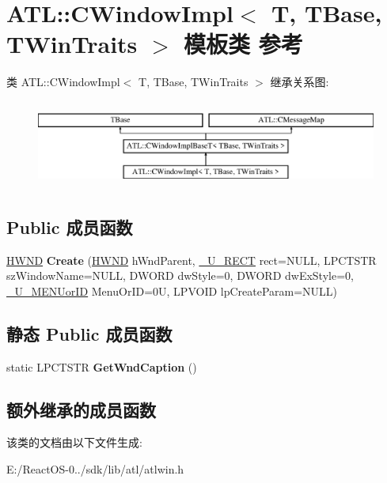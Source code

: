 \hypertarget{class_a_t_l_1_1_c_window_impl}{}\section{A\+TL\+:\+:C\+Window\+Impl$<$ T, T\+Base, T\+Win\+Traits $>$ 模板类 参考}
\label{class_a_t_l_1_1_c_window_impl}
类 A\+TL\+:\+:C\+Window\+Impl$<$ T, T\+Base, T\+Win\+Traits $>$ 继承关系图\+:\begin{figure}[H]
\begin{center}
\leavevmode
\includegraphics[height=2.937063cm]{class_a_t_l_1_1_c_window_impl}
\end{center}
\end{figure}
\subsection*{Public 成员函数}
\begin{DoxyCompactItemize}
\item 
\mbox{\label{class_a_t_l_1_1_c_window_impl_ab17adfd4f9c053f71b6b671c189622b2}} 
\hyperlink{interfacevoid}{H\+W\+ND} {\bfseries Create} (\hyperlink{interfacevoid}{H\+W\+ND} h\+Wnd\+Parent, \hyperlink{class_a_t_l_1_1___u___r_e_c_t}{\+\_\+\+U\+\_\+\+R\+E\+CT} rect=N\+U\+LL, L\+P\+C\+T\+S\+TR sz\+Window\+Name=N\+U\+LL, D\+W\+O\+RD dw\+Style=0, D\+W\+O\+RD dw\+Ex\+Style=0, \hyperlink{class_a_t_l_1_1___u___m_e_n_uor_i_d}{\+\_\+\+U\+\_\+\+M\+E\+N\+Uor\+ID} Menu\+Or\+ID=0\+U, L\+P\+V\+O\+I\+D lp\+Create\+Param=\+N\+U\+L\+L)
\end{DoxyCompactItemize}
\subsection*{静态 Public 成员函数}
\begin{DoxyCompactItemize}
\item 
\mbox{\label{class_a_t_l_1_1_c_window_impl_ad0a2989ca0b2532bbd15b13d590cf16e}} 
static L\+P\+C\+T\+S\+TR {\bfseries Get\+Wnd\+Caption} ()
\end{DoxyCompactItemize}
\subsection*{额外继承的成员函数}


该类的文档由以下文件生成\+:\begin{DoxyCompactItemize}
\item 
E\+:/\+React\+O\+S-\/0../sdk/lib/atl/atlwin.\+h\end{DoxyCompactItemize}
